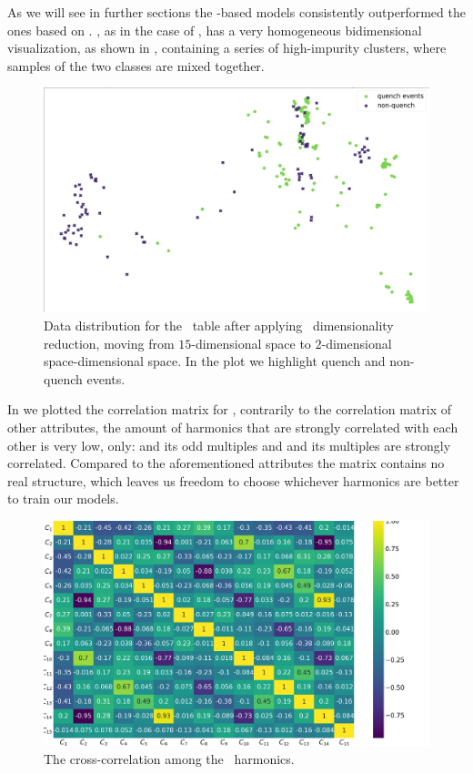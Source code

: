 \subsubsection{\phin}
As we will see in further sections the \phin-based models consistently outperformed the ones based
on \bn. \phin, as in the case of \bn, has a very homogeneous bidimensional visualization, as shown in
, containing a series of high-impurity clusters, where samples of the two classes are mixed together.
\begin{figure}[!ht]
	\centering
	\includegraphics[width=0.7\linewidth]{img/Phi_distribution.png}
	\caption{Data distribution for the \phin\ table after applying \pca\ dimensionality
		reduction, moving from $15$-dimensional space to $2$-dimensional space-dimensional
		space. In the plot we highlight quench and non-quench events.} \label{fig:phi-dist}
\end{figure}

In  we plotted the correlation matrix for \phin, contrarily to the correlation
matrix of other attributes, the amount of harmonics that are strongly correlated with each other is very
low, only: \phin[2] and its odd multiples and \phin[4] and its multiples are strongly correlated. Compared to the
aforementioned attributes the matrix contains no real structure, which leaves us freedom to choose
whichever harmonics are better to train our models.
\begin{figure}[!ht]
	\centering
	\includegraphics[width=\linewidth]{img/Phi_corr_matrix.png}
	\caption{The cross-correlation among the \phin\ harmonics.} \label{fig:phi-corr}
\end{figure}

